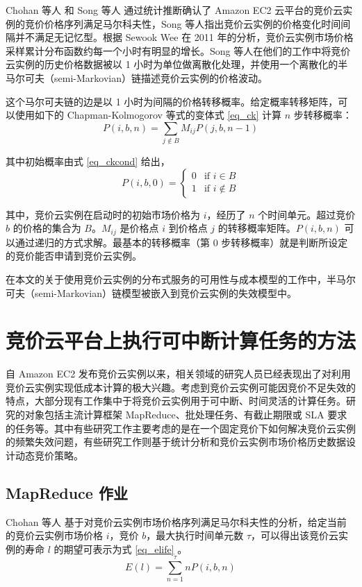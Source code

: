 Chohan 等人 \cite{chohan2010see} 和 Song 等人 \cite{song2012optimal} 通过统计推断确认了 Amazon EC2 云平台的竞价云实例的竞价价格序列满足马尔科夫性，Song 等人指出竞价云实例的价格变化时间间隔并不满足无记忆型。根据 Sewook Wee \cite{5948651} 在 2011 年的分析，竞价云实例市场价格采样累计分布函数约每一个小时有明显的增长。Song 等人在他们的工作中将竞价云实例的历史价格数据被以 1 小时为单位做离散化处理，并使用一个离散化的半马尔可夫（semi-Markovian）链描述竞价云实例的价格波动。

这个马尔可夫链的边是以 1 小时为间隔的价格转移概率。给定概率转移矩阵，可以使用如下的 Chapman-Kolmogorov 等式的变体式 \eqref{eq_ck} 计算 $n$ 步转移概率：
\begin{equation}\label{eq_ck} 
P(i, b, n) = \sum_{j \notin B}{M_{ij}P(j, b, n-1)}
\end{equation}

其中初始概率由式 \eqref{eq_ckcond} 给出，
\begin{equation}\label{eq_ckcond} 
P(i, b, 0) = 
\begin{cases}
0 &\mbox{if $i \in B$}\\
1 &\mbox{if $i \notin B$}
\end{cases}
\end{equation}

其中，竞价云实例在启动时的初始市场价格为 $i$，经历了 $n$ 个时间单元。超过竞价 $b$ 的价格的集合为 $B$。$M_{ij}$ 是价格点 $i$ 到价格点 $j$ 的转移概率矩阵。$P(i, b, n)$ 可以通过递归的方式求解。最基本的转移概率（第 0 步转移概率）就是判断所设定的竞价能否申请到竞价云实例。

在本文的关于使用竞价云实例的分布式服务的可用性与成本模型的工作中，半马尔可夫（semi-Markovian）链模型被嵌入到竞价云实例的失效模型中。

\section{竞价云平台上执行可中断计算任务的方法}
自 Amazon EC2 发布竞价云实例以来，相关领域的研究人员已经表现出了对利用竞价云实例实现低成本计算的极大兴趣。考虑到竞价云实例可能因竞价不足失效的特点，大部分现有工作集中于将竞价云实例用于可中断、时间灵活的计算任务。研究的对象包括主流计算框架 MapReduce、批处理任务、有截止期限或 SLA 要求的任务等。其中有些研究工作主要考虑的是在一个固定竞价下如何解决竞价云实例的频繁失效问题，有些研究工作则基于统计分析和竞价云实例市场价格历史数据设计动态竞价策略。

\subsection{MapReduce 作业}
Chohan 等人 \cite{chohan2010see} 基于对竞价云实例市场价格序列满足马尔科夫性的分析，给定当前的竞价云实例市场价格 $i$，竞价 $b$，最大执行时间单元数 $\tau$，可以得出该竞价云实例的寿命 $l$ 的期望可表示为式 \eqref{eq_elife} 。
\begin{equation}\label{eq_elife} 
E(l) = \sum_{n=1}^{\tau}nP(i, b, n)
\end{equation}

